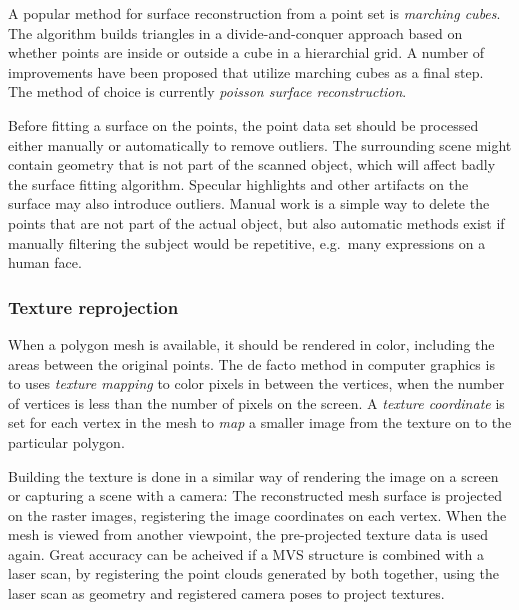 A popular method for surface reconstruction from a point set is \emph{marching cubes}. \cite{lorensen1987marching}
The algorithm builds triangles in a divide-and-conquer approach based on whether points are inside or outside a cube in a hierarchial grid.
A number of improvements have been proposed that utilize marching cubes as a final step.
The method of choice is currently \emph{poisson surface reconstruction}. \cite{kazhdan2006poisson,kazhdan2013screened}

Before fitting a surface on the points, the point data set should be processed either manually or automatically to remove outliers.
The surrounding scene might contain geometry that is not part of the scanned object, which will affect badly the surface fitting algorithm.
Specular highlights and other artifacts on the surface may also introduce outliers.
Manual work is a simple way to delete the points that are not part of the actual object, but also automatic methods exist if manually filtering the subject would be repetitive, e.g.\ many expressions on a human face.



\subsubsection{Texture reprojection} %

When a polygon mesh is available, it should be rendered in color, including the areas between the original points.
The de facto method in computer graphics is to uses \emph{texture mapping} to color pixels in between the vertices, when the number of vertices is less than the number of pixels on the screen.
A \emph{texture coordinate} is set for each vertex in the mesh to \emph{map} a smaller image from the texture on to the particular polygon. \cite{heckbert1986survey}

Building the texture is done in a similar way of rendering the image on a screen or capturing a scene with a camera:
The reconstructed mesh surface is projected on the raster images, registering the image coordinates on each vertex. \cite[p. 610]{szeliski10vision} \cite[p. 98]{heyden2005multiple}
When the mesh is viewed from another viewpoint, the pre-projected texture data is used again.
Great accuracy can be acheived if a MVS structure is combined with a laser scan, by registering the point clouds generated by both together, using the laser scan as geometry and registered camera poses to project textures. \cite{liu2006multiview}


